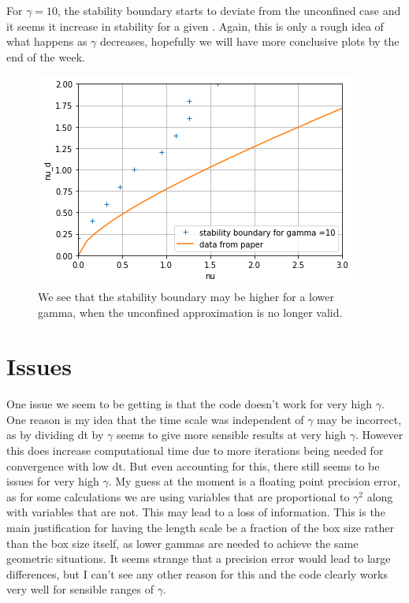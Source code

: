 \documentclass[10pt]{article}
\numberwithin{equation}{section}
\begin{document}
\begin{multicols}{2}
For $\gamma=10$, the stability boundary starts to deviate from the unconfined case and it seems it increase in stability for a given \scalebox{1.1}{$\nu$}. Again, this is only a rough idea of what happens as $\gamma$ decreases, hopefully we will have more conclusive plots by the end of the week.

\begin{figure}[H]
\centering
\includegraphics[width=\linewidth]{stability boundary gamma=10}
\caption{We see that the stability boundary may be higher for a lower gamma, when the unconfined approximation is no longer valid.}
\end{figure}

\section{Issues}
One issue we seem to be getting is that the code doesn't work for very high $\gamma$. One reason is my idea that the time scale was independent of $\gamma$ may be incorrect, as by dividing dt by $\gamma$ seems to give more sensible results at very high $\gamma$. However this does increase computational time due to more iterations being needed for convergence with low dt. But even accounting for this, there still seems to be issues for very high $\gamma$. My guess at the moment is a floating point precision error, as for some calculations we are using variables that are proportional to $\gamma^{2}$ along with variables that are not. This may lead to a loss of information. This is the main justification for having the length scale be a fraction of the box size rather than the box size itself, as lower gammas are needed to achieve the same geometric situations. It seems strange that a precision error would lead to large differences, but I can't see any other reason for this and the code clearly works very well for sensible ranges of $\gamma$. 

 \end{multicols}




\end{document}
